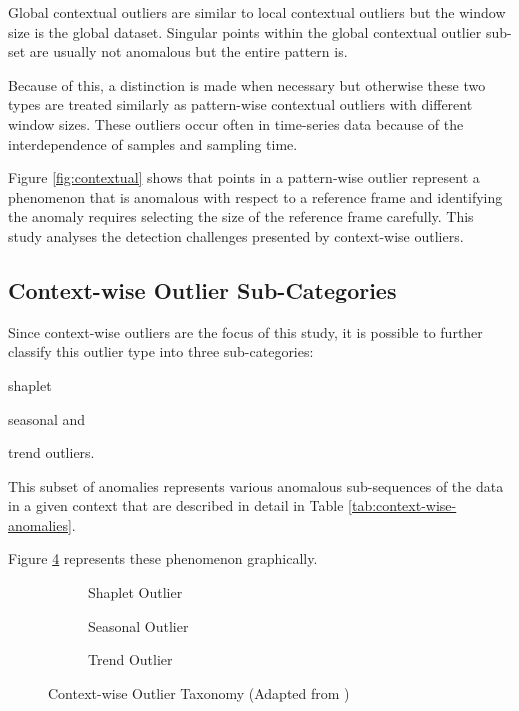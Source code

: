 Global contextual outliers are similar to local contextual outliers but the window size is the global dataset. Singular points within the global contextual outlier sub-set are usually not anomalous but the entire pattern is.

Because of this, a distinction is made when necessary but otherwise these two types are treated similarly as pattern-wise contextual outliers with different window sizes.
These outliers occur often in time-series data because of the interdependence of samples and sampling time. 
 
Figure \ref{fig:contextual} shows that points in a pattern-wise outlier represent a phenomenon that is anomalous with respect to a reference frame and identifying the anomaly requires selecting the size of the reference frame carefully. This study analyses the detection challenges presented by context-wise outliers.


\subsection{Context-wise Outlier Sub-Categories}

Since context-wise outliers are the focus of this study, it is possible to further classify this outlier type into three sub-categories:
\begin{inlinelist}
    \item shaplet
    \item seasonal and
    \item trend outliers.
\end{inlinelist}
This subset of anomalies represents various anomalous sub-sequences of the data in a given context that are described in detail in Table \ref{tab:context-wise-anomalies}.



Figure \ref{fig:contextual-outliers} represents these phenomenon graphically. 

\begin{figure}[H]
     \centering
     \begin{subfigure}[b]{0.3\textwidth}
         \centering
         {\resizebox{\textwidth}{!}{}}
         \caption{Shaplet Outlier}
         \label{fig:shaplet}
     \end{subfigure}
     \hfill
     \begin{subfigure}[b]{0.3\textwidth}
         \centering
         {\resizebox{\textwidth}{!}{}}
         \caption{Seasonal Outlier}
         \label{fig:seasonal}
     \end{subfigure}
     \hfill
     \begin{subfigure}[b]{0.3\textwidth}
         \centering
         {\resizebox{\textwidth}{!}{}}
         \caption{Trend Outlier}
         \label{fig:trend}
     \end{subfigure}
        \caption{Context-wise Outlier Taxonomy (Adapted from \cite{lai2021revisiting})}
        \label{fig:contextual-outliers}
\end{figure}

